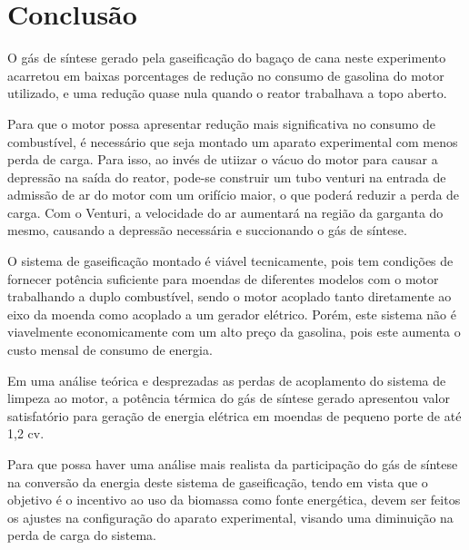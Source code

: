 \chapter[Conclusão]{Conclusão}

O gás de síntese gerado pela gaseificação do bagaço de cana neste experimento acarretou em baixas porcentages de redução no consumo de gasolina do motor utilizado, e uma redução quase nula quando o reator trabalhava a topo aberto.

Para que o motor possa apresentar redução mais significativa no consumo de combustível, é necessário que seja montado um aparato experimental com menos perda de carga. Para isso, ao invés de utiizar o vácuo do motor para causar a depressão na saída do reator, pode-se construir um tubo venturi na entrada de admissão de ar do motor com um orifício maior, o que poderá reduzir a perda de carga. Com o Venturi, a velocidade do ar aumentará na região da garganta do mesmo, causando a depressão necessária e succionando o gás de síntese.

O sistema de gaseificação montado é viável tecnicamente, pois tem condições de fornecer potência suficiente para moendas de diferentes modelos com o motor trabalhando a duplo combustível, sendo o motor acoplado tanto diretamente ao eixo da moenda como acoplado a um gerador elétrico. Porém, este sistema não é viavelmente economicamente com um alto preço da gasolina, pois este aumenta o custo mensal de consumo de energia.


Em uma análise teórica e desprezadas as perdas de acoplamento do sistema de limpeza ao motor, a potência térmica do gás de síntese gerado apresentou valor satisfatório para geração de energia elétrica em moendas de pequeno porte de até 1,2 cv.

Para que possa haver uma análise mais realista da participação do gás de síntese na conversão da energia deste sistema de gaseificação, tendo em vista que o objetivo é o incentivo ao uso da biomassa como fonte energética, devem ser feitos os ajustes na configuração do aparato experimental, visando uma diminuição na perda de carga do sistema.